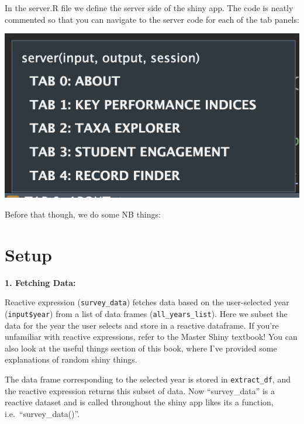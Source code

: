 \documentclass[
]{book}
\newenvironment{Shaded}{\begin{snugshade}}{\end{snugshade}}
\newcommand{\FunctionTok}[1]{\textcolor[rgb]{0.13,0.29,0.53}{\textbf{#1}}}
\newcommand{\NormalTok}[1]{#1}
\newcommand{\OtherTok}[1]{\textcolor[rgb]{0.56,0.35,0.01}{#1}}
\newcommand{\SpecialCharTok}[1]{\textcolor[rgb]{0.81,0.36,0.00}{\textbf{#1}}}
\begin{document}
In the server.R file we define the server side of the shiny app. The code is neatly commented so that you can navigate to the server code for each of the tab panels:

\includegraphics{images/server.png}

Before that though, we do some NB things:

\hypertarget{setup}{%
\section{Setup}\label{setup}}

\textbf{1. Fetching Data:}

Reactive expression (\texttt{survey\_data}) fetches data based on the user-selected year (\texttt{input\$year}) from a list of data frames (\texttt{all\_years\_list}). Here we subset the data for the year the user selects and store in a reactive dataframe. If you're unfamiliar with reactive expressions, refer to the Master Shiny textbook! You can also look at the useful things section of this book, where I've provided some explanations of random shiny things.

The data frame corresponding to the selected year is stored in \texttt{extract\_df}, and the reactive expression returns this subset of data. Now ``survey\_data'' is a reactive dataset and is called throughout the shiny app likes its a function, i.e.~``survey\_data()''.

\begin{Shaded}
\end{Shaded}
\end{document}
